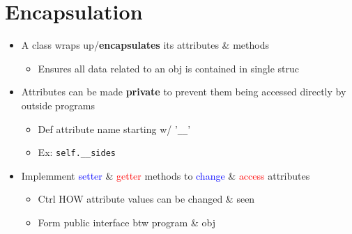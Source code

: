 \documentclass{article}
\begin{document}
\section{Encapsulation}
    \begin{multicols}{2}
        \begin{itemize}
            \item A class wraps up/\textbf{encapsulates} its attributes \& methods
                \begin{itemize}
                    \item Ensures all data related to an obj is contained in single struc
                \end{itemize}
            \item Attributes can be made \textbf{private} to prevent them being accessed directly by outside programs
                \begin{itemize}
                    \item Def attribute name starting w/ '\texttt{\_\_}'
                    \item Ex: \texttt{self.\_\_sides}
                \end{itemize}
            \item Implemment \textcolor{blue}{setter} \& \textcolor{red}{getter} methods to \textcolor{blue}{change} \& \textcolor{red}{access} attributes
                \begin{itemize}
                    \item Ctrl HOW attribute values can be changed \& seen
                    \item Form public interface btw program \& obj
                \end{itemize}
        \end{itemize}
    \end{multicols}
\end{document}
